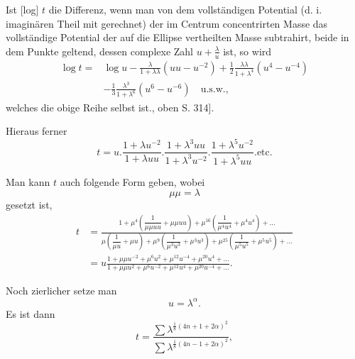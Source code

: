 \begingroup
\makeatletter\tagsleft@true\let\veqno\@@leqno\makeatother
\clearpage{}
\par\indent Ist [log] $t$ die Differenz, wenn man von dem vollständigen Potential (d. i. imaginären Theil mit gerechnet) der im Centrum concentrirten Masse das vollständige Potential der auf die Ellipse vertheilten Masse subtrahirt, beide in dem Punkte geltend, dessen complexe Zahl $u+\frac\lambda u$ ist, so wird
\clearpage{}
\begin{equation}
\begin{aligned}
\log t={}&\log u-\frac\lambda{1+\lambda\lambda}(uu-u^{-2})+\frac12\frac{\lambda\lambda}{1+\lambda^4}(u^4-u^{-4})\\
&-\frac13\frac{\lambda^3}{1+\lambda^6}(u^6-u^{-6})\quad\text{u.s.w.,}
\end{aligned}\tag*{[14]}
\end{equation}
\noindent welches die obige Reihe selbst ist.\quad[Siehe die Gl. [7], oben S. 314].
\par\indent Hieraus ferner
\begin{equation}
t=u.\frac{1+\lambda u^{-2}}{1+\lambda uu}.\frac{1+\lambda^3uu}{1+\lambda^3u^{-2}}.\frac{1+\lambda^5u^{-2}}{1+\lambda^5uu}.\text{etc.}\tag*{[15]}
\end{equation}
\par\indent Man kann $t$ auch folgende Form geben, wobei
\[\mu\mu=\lambda\]
\noindent gesetzt ist,
{\small\begin{equation}
\begin{aligned}
t&=\frac{1+\mu^4\left(\dfrac1{\mu\mu uu}+\mu\mu uu\right)+\mu^{16}\left(\dfrac1{\mu^4u^4}+\mu^4u^4\right)+{.}{.}{.}}{\mu\left(\dfrac1{\mu u}+\mu u\right)+\mu^9\left(\dfrac1{\mu^3u^3}+\mu^3u^3\right)+\mu^{25}\left(\dfrac1{\mu^5u^5}+\mu^5u^5\right)+{.}{.}{.}}\\[7pt]
&=u\frac{1+\mu\mu u^{-2}+\mu^6u^2+\mu^{12}u^{-4}+\mu^{20}u^4+{.}{.}{.}}{1+\mu\mu u^2+\mu^6u^{-2}+\mu^{12}u^4+\mu^{20}u^{-4}+{.}{.}{.}}.
\end{aligned}\tag*{[16]}
\end{equation}}
\noindent {\small[S. 224]}
\par\indent Noch zierlicher setze man
\[u=\lambda^\alpha.\]
\noindent Es ist dann
\begin{equation}
t=\frac{\sum\lambda^{\frac18(4n+1+2\alpha)^2}}{\sum\lambda^{\frac18(4n-1+2\alpha)^2}},\tag*{[17]}
\end{equation}
